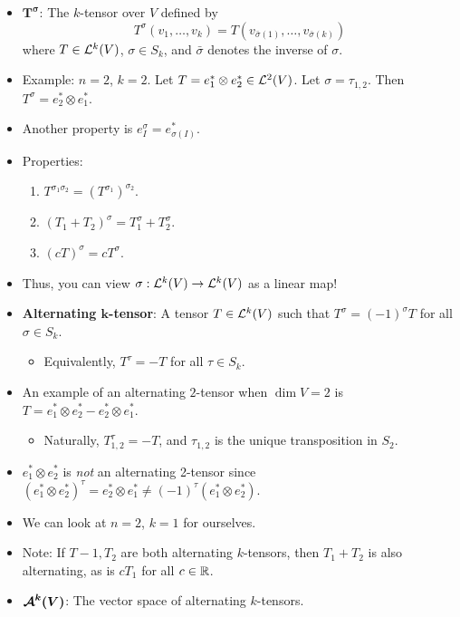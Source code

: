\documentclass[../notes.tex]{subfiles}
\begin{document}
\begin{itemize}
    \item $\bm{T^\sigma}$: The $k$-tensor over $V$ defined by
    \begin{equation*}
        T^\sigma(v_1,\dots,v_k) = T(v_{\bar{\sigma}(1)},\dots,v_{\bar{\sigma}(k)})
    \end{equation*}
    where $T\in\lin[k]{V}$, $\sigma\in S_k$, and $\bar{\sigma}$ denotes the inverse of $\sigma$.
    \item Example: $n=2$, $k=2$. Let $T=e_1^*\otimes e_2^*\in\lin[2]{V}$. Let $\sigma=\tau_{1,2}$. Then $T^\sigma=e_2^*\otimes e_1^*$.
    \item Another property is $e_I^\sigma=e_{\sigma(I)}^*$.
    \item Properties:
    \begin{enumerate}
        \item $T^{\sigma_1\sigma_2}=(T^{\sigma_1})^{\sigma_2}$.
        \item $(T_1+T_2)^\sigma=T_1^\sigma+T_2^\sigma$.
        \item $(cT)^\sigma=cT^\sigma$.
    \end{enumerate}
    \item Thus, you can view $\sigma:\lin[k]{V}\to\lin[k]{V}$ as a linear map!
    \item \textbf{Alternating $\bm{k}$-tensor}: A tensor $T\in\lin[k]{V}$ such that $T^\sigma=(-1)^\sigma T$ for all $\sigma\in S_k$.
    \begin{itemize}
        \item Equivalently, $T^\tau=-T$ for all $\tau\in S_k$.
    \end{itemize}
    \item An example of an alternating $2$-tensor when $\dim V=2$ is $T=e_1^*\otimes e_2^*-e_2^*\otimes e_1^*$.
    \begin{itemize}
        \item Naturally, $T^\tau_{1,2}=-T$, and $\tau_{1,2}$ is the unique transposition in $S_2$.
    \end{itemize}
    \item $e_1^*\otimes e_2^*$ is \emph{not} an alternating 2-tensor since $(e_1^*\otimes e_2^*)^\tau=e_2^*\otimes e_1^*\neq(-1)^\tau(e_1^*\otimes e_2^*)$.
    \item We can look at $n=2$, $k=1$ for ourselves.
    \item Note: If $T-1,T_2$ are both alternating $k$-tensors, then $T_1+T_2$ is also alternating, as is $cT_1$ for all $c\in\R$.
    \item $\bm{\alt[k]{V}}$: The vector space of alternating $k$-tensors.

\end{itemize}
\end{document}
